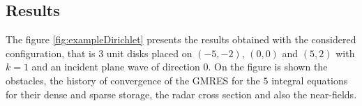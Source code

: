 \subsection{Results}

The figure \ref{fig:exampleDirichlet} presents the results obtained with the considered configuration, that is $3$ unit disks placed on $(-5,-2)$, $(0,0)$ and $(5,2)$ with $k=1$ and an incident plane wave of direction $0$. On the figure is shown the obstacles, the history of convergence of the GMRES for the $5$ integral equations for their dense and sparse storage, the radar cross section and also the near-fields.

\begin{figure}
\centering
{}

\end{figure}
